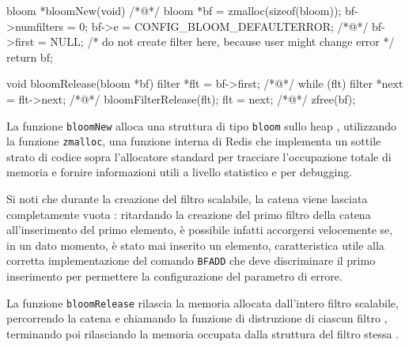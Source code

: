 \begin{commentedsource}[style=csource,caption=Creazione e distruzione di un filtro scalabile]
bloom *bloomNew(void) {
/*@\lnote@*/	bloom *bf = zmalloc(sizeof(bloom));
	bf->numfilters = 0; 
    bf->e = CONFIG_BLOOM_DEFAULTERROR;
/*@\lnote@*/    bf->first = NULL; /* do not create filter here, because user might change error */ 
	return bf;
}

void bloomRelease(bloom *bf) {
    filter *flt = bf->first;
/*@\lnote@*/    while (flt) { 
        filter *next = flt->next;
/*@\lnote@*/        bloomFilterRelease(flt); 
        flt = next;
    }
/*@\lnote@*/    zfree(bf); 
}
\end{commentedsource}

La funzione \verb|bloomNew| alloca una struttura di tipo \verb|bloom| sullo heap ,
utilizzando la funzione \verb|zmalloc|, una funzione interna di Redis che implementa un sottile
strato di codice sopra l'allocatore standard per tracciare l'occupazione totale di memoria e fornire
informazioni utili a livello statistico e per debugging.

Si noti che durante la creazione del filtro scalabile, la catena viene lasciata completamente vuota
: ritardando la creazione del primo filtro della catena all'inserimento del primo elemento,
è possibile infatti accorgersi velocemente se, in un dato momento, è stato mai inserito un elemento,
caratteristica utile alla corretta implementazione del comando \verb|BFADD| che deve discriminare il
primo inserimento per permettere la configurazione del parametro di errore.

La funzione \verb|bloomRelease| rilascia la memoria allocata dall'intero filtro scalabile,
percorrendo la catena  e chiamando la funzione di distruzione di ciascun filtro ,
terminando poi rilasciando la memoria occupata dalla struttura del filtro stessa .


